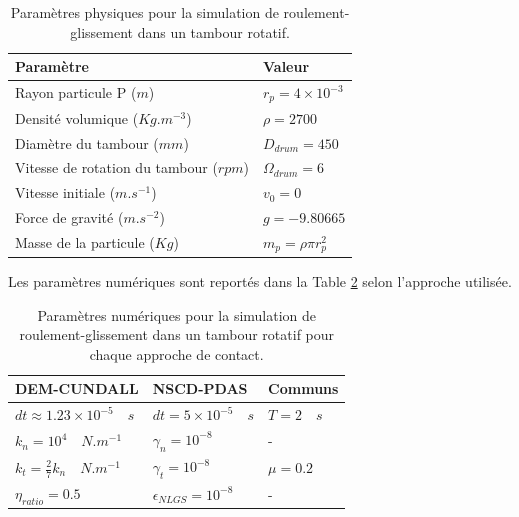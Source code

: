 \begin{center}
\begin{table}[!h]
\begin{tabular}{ |p{6.5cm}|p{6.1cm}| }
 \hline \rowcolor{lightgray}
 Paramètre& Valeur\\
 \hline
 Rayon particule P  ($m$) & $r_p = 4\times10^{-3}$\\
 Densité volumique ($Kg.m^{-3}$)& $\rho = 2700$\\
 Diamètre du tambour ($mm$) & $D_{drum} = 450$\\
 Vitesse de rotation du tambour ($rpm$) & $\Omega_{drum} = 6$\\
 Vitesse initiale  ($m.s^{-1}$)  &$v_0 = 0$\\
 Force de gravité ($m.s^{-2}$)& $g = -9.80665$\\
 Masse de la particule ($Kg$)  &$m_p = \rho \pi r_p^{2}$\\
 \hline
\end{tabular}
\caption{Paramètres physiques pour la simulation de roulement-glissement dans un tambour rotatif.}\label{tab_43}
\end{table}
\end{center}

\vspace{-1.5cm}

\noindent Les paramètres numériques sont reportés dans la Table \ref{tab_44} selon l'approche utilisée. 

\begin{center}
\begin{table}[!h]
\begin{tabular}{ |p{5.5cm}|p{3.8cm}|p{3.4cm}| }
 \hline \rowcolor{lightgray}
 DEM-CUNDALL& NSCD-PDAS& Communs\\
 \hline
 $dt \approx 1.23\times10^{-5} \quad s$ & $dt = 5\times10^{-5} \quad s$ & $T = 2 \quad s$\\
 $k_n = 10^4 \quad N.m^{-1}$ & $\gamma_n = 10^{-8}$ & -\\
 $k_t = \frac{2}{7} k_n \quad N.m^{-1}$ & $\gamma_t = 10^{-8}$ & $\mu = 0.2$\\
 $\eta_{ratio} = 0.5$ & $\epsilon_{NLGS} =  10^{-8}$ & -\\
 \hline
\end{tabular}
\caption{Paramètres numériques pour la simulation de roulement-glissement dans un tambour rotatif pour chaque approche de contact.}\label{tab_44}
\end{table}
\end{center}

